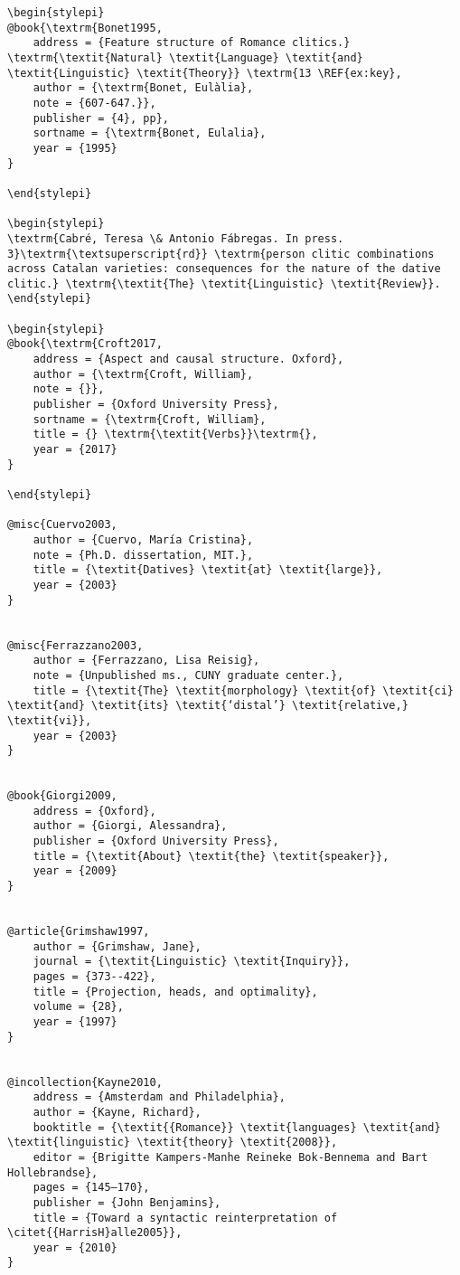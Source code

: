 \documentclass[output=paper,modfonts,nonflat]{langsci/langscibook}
\begin{document}
\begin{verbatim}
\begin{stylepi}
@book{\textrm{Bonet1995,
	address = {Feature structure of Romance clitics.} \textrm{\textit{Natural} \textit{Language} \textit{and} \textit{Linguistic} \textit{Theory}} \textrm{13 \REF{ex:key},
	author = {\textrm{Bonet, Eulàlia},
	note = {607-647.}},
	publisher = {4}, pp},
	sortname = {\textrm{Bonet, Eulalia},
	year = {1995}
}

\end{stylepi}

\begin{stylepi}
\textrm{Cabré, Teresa \& Antonio Fábregas. In press. 3}\textrm{\textsuperscript{rd}} \textrm{person clitic combinations across Catalan varieties: consequences for the nature of the dative clitic.} \textrm{\textit{The} \textit{Linguistic} \textit{Review}}.
\end{stylepi}

\begin{stylepi}
@book{\textrm{Croft2017,
	address = {Aspect and causal structure. Oxford},
	author = {\textrm{Croft, William},
	note = {}},
	publisher = {Oxford University Press},
	sortname = {\textrm{Croft, William},
	title = {} \textrm{\textit{Verbs}}\textrm{},
	year = {2017}
}

\end{stylepi}

@misc{Cuervo2003,
	author = {Cuervo, María Cristina},
	note = {Ph.D. dissertation, MIT.},
	title = {\textit{Datives} \textit{at} \textit{large}},
	year = {2003}
}


@misc{Ferrazzano2003,
	author = {Ferrazzano, Lisa Reisig},
	note = {Unpublished ms., CUNY graduate center.},
	title = {\textit{The} \textit{morphology} \textit{of} \textit{ci} \textit{and} \textit{its} \textit{‘distal’} \textit{relative,} \textit{vi}},
	year = {2003}
}


@book{Giorgi2009,
	address = {Oxford},
	author = {Giorgi, Alessandra},
	publisher = {Oxford University Press},
	title = {\textit{About} \textit{the} \textit{speaker}},
	year = {2009}
}


@article{Grimshaw1997,
	author = {Grimshaw, Jane},
	journal = {\textit{Linguistic} \textit{Inquiry}},
	pages = {373--422},
	title = {Projection, heads, and optimality},
	volume = {28},
	year = {1997}
}


@incollection{Kayne2010,
	address = {Amsterdam and Philadelphia},
	author = {Kayne, Richard},
	booktitle = {\textit{{Romance}} \textit{languages} \textit{and} \textit{linguistic} \textit{theory} \textit{2008}},
	editor = {Brigitte Kampers-Manhe Reineke Bok-Bennema and Bart Hollebrandse},
	pages = {145–170},
	publisher = {John Benjamins},
	title = {Toward a syntactic reinterpretation of \citet{{HarrisH}alle2005}},
	year = {2010}
}



\end{verbatim}
\end{document}
